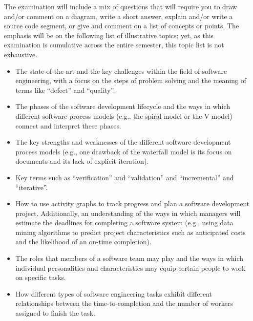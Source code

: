 \noindent The examination will include a mix of questions that will require you to draw and/or comment on a diagram,
write a short answer, explain and/or write a source code segment, or give and comment on a list of concepts or points.
The emphasis will be on the following list of illustrative topics; yet, as this examination is cumulative across the
entire semester, this topic list is not exhaustive.

\vspace*{-.05in}
\begin{itemize}

  \itemsep 0in

  \item The state-of-the-art and the key challenges within the field of software engineering, with a focus on the steps
    of problem solving and the meaning of terms like ``defect'' and ``quality''.

  \item The phases of the software development lifecycle and the ways in which different software process models (e.g.,
    the spiral model or the V model) connect and interpret these phases.

  \item The key strengths and weaknesses of the different software development process models (e.g., one drawback of
    the waterfall model is its focus on documents and its lack of explicit iteration).

  \item Key terms such as ``verification'' and ``validation'' and ``incremental'' and ``iterative''.

  \item How to use activity graphs to track progress and plan a software development project. Additionally, an
    understanding of the ways in which managers will estimate the deadlines for completing a software system (e.g.,
    using data mining algorithms to predict project characteristics such as anticipated costs and the likelihood of an
    on-time completion).

  \item The roles that members of a software team may play and the ways in which individual personalities
    and characteristics may equip certain people to work on specific tasks.

  \item How different types of software engineering tasks exhibit different relationships between the time-to-completion
    and the number of workers assigned to finish the task.


\end{itemize}
